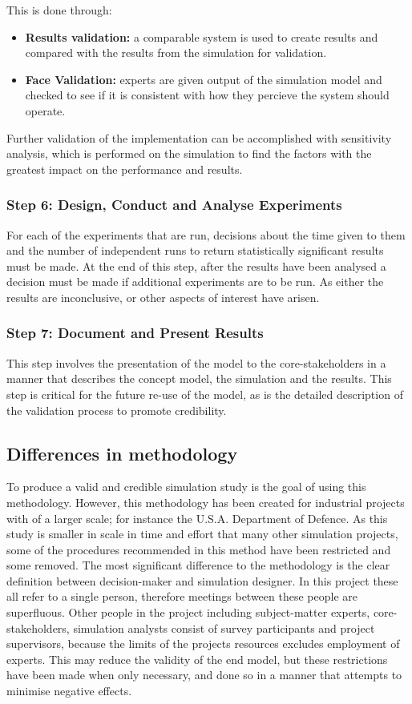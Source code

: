 This is done through:
\begin{itemize}
  \item \textbf{Results validation: } a comparable system is used to create results and compared with the results from the simulation for validation.
  \item \textbf{Face Validation: } experts are given output of the simulation model and checked to see if it is consistent with how they percieve the system should operate.
\end{itemize}

Further validation of the implementation can be accomplished with sensitivity analysis,
which is performed on the simulation to find the factors with the greatest impact on the performance and results.

\subsubsection{Step 6: Design, Conduct and Analyse Experiments}
For each of the experiments that are run, decisions about the time given to them and the number of independent runs to return statistically significant results must be made.
At the end of this step, after the results have been analysed a decision must be made if additional experiments are to be run.
As either the results are inconclusive, or other aspects of interest have arisen.

\subsubsection{Step 7: Document and Present Results}
This step involves the presentation of the model to the core-stakeholders in a manner that describes the concept model, the simulation and the results.
This step is critical for the future re-use of the model, as is the detailed description of the validation process to promote credibility.


\subsection{Differences in methodology}
To produce a valid and credible simulation study is the goal of using this methodology.
However, this methodology has been created for industrial projects with of a larger scale; for instance the U.S.A. Department of Defence.
As this study is smaller in scale in time and effort that many other simulation projects, some of the procedures recommended in this method have been restricted and some removed.
The most significant difference to the methodology is the clear definition between decision-maker and simulation designer.
In this project these all refer to a single person, therefore meetings between these people are superfluous.
Other people in the project including subject-matter experts, core-stakeholders, simulation analysts consist of survey participants and
project supervisors, because the limits of the projects resources excludes employment of experts.
This may reduce the validity of the end model, but these restrictions have been made when only necessary,
and done so in a manner that attempts to minimise negative effects.


